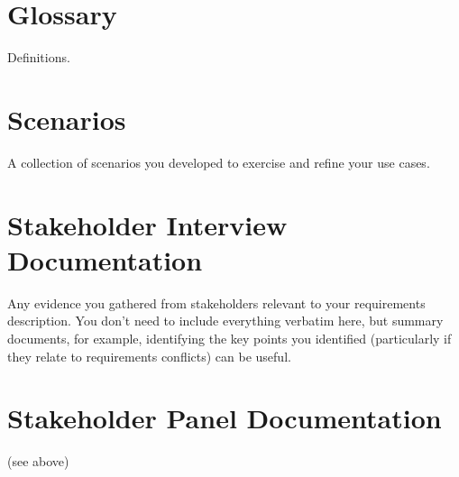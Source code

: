 \documentclass{l3deliverable}
\begin{document}
\section{Glossary}

Definitions.

\section{Scenarios}

A collection of scenarios you developed to exercise and refine your
use cases.

\section{Stakeholder Interview Documentation}

Any evidence you gathered from stakeholders relevant to your
requirements description.  You don't need to include everything
verbatim here, but summary documents, for example, identifying the key
points you identified (particularly if they relate to requirements
conflicts) can be useful.

\section{Stakeholder Panel Documentation}

(see above)

\end{document}
